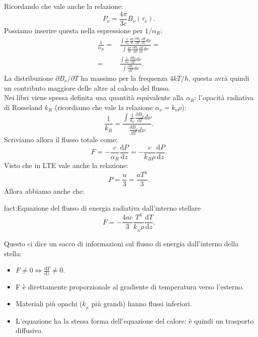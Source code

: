 Ricordando che vale anche la relazione:
\[
	P_{\nu} 
	=
	\frac{4\pi}{3c} B_{\nu} (\tau_{\nu} )
.\] 
Possiamo inserire questa nella espressione per $1/\alpha_R$:
\[\begin{aligned}
	\frac{1}{\alpha_R}
	=&
	\frac{
		\int \frac{1}{\alpha_{\nu}}\frac{4\pi}{3c}
		\frac{\partial B_{\nu} }{\partial T} \frac{\partial T}{\partial z}d\nu
	}{
		\int \frac{4\pi}{3c}
		\frac{\partial B_{\nu} }{\partial T} \frac{\partial T}{\partial z}d\nu
	}=\\
	=&
	\frac{
		\int \frac{1}{\alpha_{\nu} } 
	\frac{\partial B_{\nu} }{\partial T} d\nu
	}{
	\int \frac{\partial B_{\nu} }{\partial T} d\nu
	}
.\end{aligned}\]
La distribuzione $\partial  B_{\nu} /\partial T$ ha massimo per la frequenza $4kT/h$, questa avrà quindi un contributo maggiore delle altre al calcolo del flusso.\\
Nei libri viene spessa definita una quantità equivalente alla $\alpha_R$: l'opacità radiativa di Rosseland $k_R$ (ricordiamo che vale la relazione $\alpha_{\nu} = k_{\nu} \rho$):
\[
	\frac{1}{k_R} 
	=
	\frac{
	\int \frac{1}{k_{\nu}}\frac{\partial B_{\nu} }{\partial T} d\nu
	}{
	\frac{\partial B_{\nu} }{\partial T} d\nu 
	}	
.\] 
Scriviamo allora il flusso totale come:
\[
	F =-\frac{c}{\alpha_R}\frac{\mbox{d} P}{\mbox{d} z} = 
	-\frac{c}{k_R\rho }\frac{\mbox{d} P}{\mbox{d} z} 
.\] 
Visto che in LTE vale anche la relazione:
\[
	P = \frac{u}{3}= \frac{aT^4}{3}
.\] 
Allora abbiamo anche che:
\begin{fact}{fact:Equazione del flusso di energia radiativa dall'interno stellare}
	\[
	F 
	=
	-\frac{4ac}{3}\frac{T^3}{k_{_R}\rho} \frac{\mbox{d} T}{\mbox{d} z} 
	.\] 
\end{fact}
Questo ci dice un sacco di informazioni sul flusso di energia dall'interno della stella:
\begin{itemize}
	\item $F \neq 0 \Longleftrightarrow \frac{\mbox{d} T}{\mbox{d} z} \neq 0$.
	\item F è direttamente proporzionale al gradiente di temperatura verso l'esterno.
	\item Materiali più opachi ($k_{_R}$ più grandi) hanno flussi inferiori.
	\item L'equazione ha la stessa forma dell'equazione del calore: è quindi un trasporto diffusivo.
\end{itemize}
